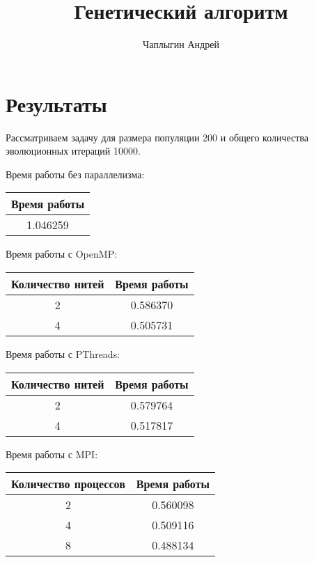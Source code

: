 \documentclass[12pt]{article}
\title{Генетический алгоритм}
\author{Чаплыгин Андрей}
\date{}
\begin{document}
\maketitle

\section{Результаты}

Рассматриваем задачу для размера популяции 200 и общего количества эволюционных итераций 10000.

Время работы без параллелизма:
\begin{center}
    \begin{tabular}{c}
      \hline
      Время работы  \\
      \hline
      1.046259 \\
       \hline
    \end{tabular}
\end{center}

Время работы с OpenMP:
\begin{center}
    \begin{tabular}{c|c}
      \hline
      Количество нитей & Время работы  \\
      \hline
      2 & 0.586370 \\
      \hline
      4 & 0.505731 \\
       \hline
    \end{tabular}
\end{center}

Время работы с PThreads:
\begin{center}
    \begin{tabular}{c|c}
       \hline
      Количество нитей & Время работы  \\
      \hline
      2 & 0.579764  \\
      \hline
      4 & 0.517817 \\
       \hline
    \end{tabular}
\end{center}

Время работы с MPI:
\begin{center}
    \begin{tabular}{c|c}
       \hline
      Количество процессов & Время работы  \\
      \hline
      2 & 0.560098 \\
      \hline
      4 & 0.509116 \\
       \hline
      8 & 0.488134 \\
      \hline
    \end{tabular}
\end{center}
\end{document}
